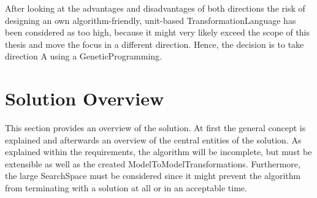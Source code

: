 After looking at the advantages and disadvantages of both directions the risk of designing an own algorithm-friendly, unit-based \gls{TransformationLanguage} has been considered as too high, because it might very likely exceed the scope of this thesis and move the focus in a different direction. Hence, the decision is to take direction A using a \gls{GeneticProgramming}. 



\section{Solution Overview}
\label{secSolutionOverview}

This section provides an overview of the solution. At first the general concept is explained and afterwards an overview of the central entities of the solution. As explained within the requirements, the algorithm will be incomplete, but must be extensible as well as the created \glspl{ModelToModelTransformation}. Furthermore, the large \gls{SearchSpace} must be considered since it might prevent the algorithm from terminating with a solution at all or in an acceptable time.

